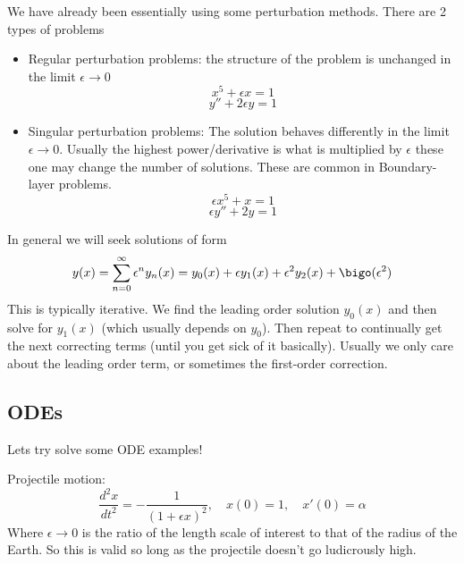 \documentclass{X:/Documents/Coding/Latex/myassignment}
\begin{document}
We have already been essentially using some perturbation methods. There are 2 types of problems
\begin{itemize}
    \item Regular perturbation problems: the structure of the problem is unchanged in the limit $\epsilon\to 0$
    \[x^5 + \epsilon x =1\]
    \[y'' + 2\epsilon y = 1\]
    \item Singular perturbation problems: The solution behaves differently in the limit $\epsilon\to 0$. Usually the highest power/derivative is what is multiplied by $\epsilon$ these one may change the number of solutions. These are common in Boundary-layer problems. 
    \[\epsilon x^5 + x =1\]
    \[\epsilon y'' + 2y =1\]
\end{itemize}

In general we will seek solutions of form
\[y(x) = \sum_{n=0}^\infty \epsilon^n y_n(x) = y_0(x) + \epsilon y_1(x) + \epsilon^2 y_2(x) + \bigo(\epsilon^2)\]
This is typically iterative. We find the leading order solution $y_0(x)$ and then solve for $y_1(x)$ (which usually depends on $y_0$). Then repeat to continually get the next correcting terms (until you get sick of it basically). Usually we only care about the leading order term, or sometimes the first-order correction.


\subsection{ODEs}
Lets try solve some ODE examples!

Projectile motion:
\[\frac{d^2x}{dt^2} = - \frac{1}{(1+\epsilon x)^2}, \quad x(0)=1, \quad x'(0) = \alpha\]
Where $\epsilon\to 0$ is the ratio of the length scale of interest to that of the radius of the Earth. So this is valid so long as the projectile doesn't go ludicrously high.
\end{document}
